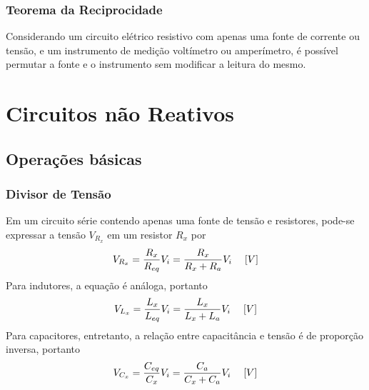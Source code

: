 \documentclass{article}
\numberwithin{equation}{section}
\begin{document}
    \subsubsection{Teorema da Reciprocidade}
    Considerando um circuito elétrico resistivo com apenas uma fonte de corrente ou tensão, e um instrumento de medição voltímetro ou amperímetro, é possível permutar a fonte e o instrumento sem modificar a leitura do mesmo.


    \newpage

    \section{Circuitos não Reativos}
    \label{sec:resistivos}

    \subsection{Operações básicas}

    \subsubsection{Divisor de Tensão} %
    \label{subsubsec:divten}
    Em um circuito série contendo apenas uma fonte de tensão e resistores, pode-se expressar a tensão $V_{R_x}$ em um resistor $R_{x}$ por
    \begin{equation}
        V_{R_x}=\frac{R_{x}}{R_{eq}}V_{i}=\frac{R_{x}}{R_{x}+R_{a}}V_{i} \hspace{0.45cm}[V]
    \end{equation}
    Para indutores, a equação é análoga, portanto
    \begin{equation}
        V_{L_x}=\frac{L_{x}}{L_{eq}}V_{i}=\frac{L_{x}}{L_{x}+L_{a}}V_{i} \hspace{0.45cm}[V]
    \end{equation}
    Para capacitores, entretanto, a relação entre capacitância e tensão é de proporção inversa, portanto
    \begin{equation}
        V_{C_x}=\frac{C_{eq}}{C_{x}}V_{i}=\frac{C_{a}}{C_{x}+C_{a}}V_{i} \hspace{0.45cm}[V]
    \end{equation}
\end{document}
